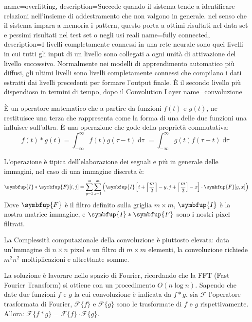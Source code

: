 {
    name=overfitting,
    description={Succede quando il sistema tende a identificare relazioni nell’insieme di addestramento che non valgono in generale. nel senso che il sistema impara a memoria i pattern, questo porta a ottimi risultati nel data set e pessimi risultati nel test set o negli usi reali}
}
{
    name={fully connected},
    description={I livelli completamente connessi in una rete neurale sono quei livelli in cui tutti gli input di
            un livello sono collegati a ogni unità di attivazione del livello successivo. Normalmente nei modelli di
            apprendimento automatico più diffusi, gli ultimi livelli sono livelli completamente connessi
            che compilano i dati estratti dai livelli precedenti per formare l’output finale. È il secondo
            livello più dispendioso in termini di tempo, dopo il \gls{Convolution Layer}}
}
{
    name=convoluzione}{
    È un operatore matematico che a partire da funzioni \(f(t)\) e \(g(t)\), ne restituisce una terza che rappresenta come la forma di una delle due funzioni una influisce sull’altra. È una operazione che gode della proprietà commutativa:
    \[ f ( t ) * g ( t ) = \int _ { - \infty } ^ { \infty } f ( t ) g ( \tau - t ) \mathop{\mathrm{d} \tau}  = \int _ { - \infty } ^ { \infty } g ( t ) f ( \tau - t ) \mathop{\mathrm{d} \tau}\]

    L'operazione è tipica dell'elaborazione dei segnali e più in generale delle immagini,  nel caso di una immagine discreta è:\[ \symbfup { I } * \symbfup{F} [ i , j ] = \sum _ { y = 1 } ^ { m } \sum _ { x = 1 } ^ { m } \left( \symbfup { I } \left[ i + \left\lceil \frac { m } { 2 } \right\rceil - y , j + \left\lceil \frac { m } { 2 } \right] - x \right] \cdot \symbfup { F } [ y , x ] \right) \]
    Dove \(\symbfup{F}\) è il filtro definito sulla griglia \(m \times m\), \(\symbfup{I}\) è la nostra matrice immagine, e \(\symbfup { I } * \symbfup{F}\) sono i nostri pixel filtrati.

    La Complessità
    computazionale  della convoluzione è
    piuttosto elevata: data
    un’immagine di \(n\times n\)
    pixel e un filtro di
    \(m\times m\)
    elementi, la
    convoluzione
    richiede \(m^2 n^2\)
    moltiplicazioni e
    altrettante somme.

    La soluzione è lavorare nello spazio di Fourier, ricordando che la FFT (Fast Fourier Transform) si ottiene con un procedimento \(O(n \log n)\). Sapendo che date due funzioni  \( f \) e \( g \) la cui convoluzione è indicata da \( f * g \), sia \( \mathcal { F } \) l'operatore trasformata di Fourier,  \( \mathcal { F } \{ f \} \) e \( \mathcal { F } \{ g \} \) sono le trasformate di \( f \) e \( g \) rispettivamente. Allora:
    \( \mathcal { F } \{ f * g \} = \mathcal { F } \{ f \} \cdot \mathcal { F } \{ g \} \).}


